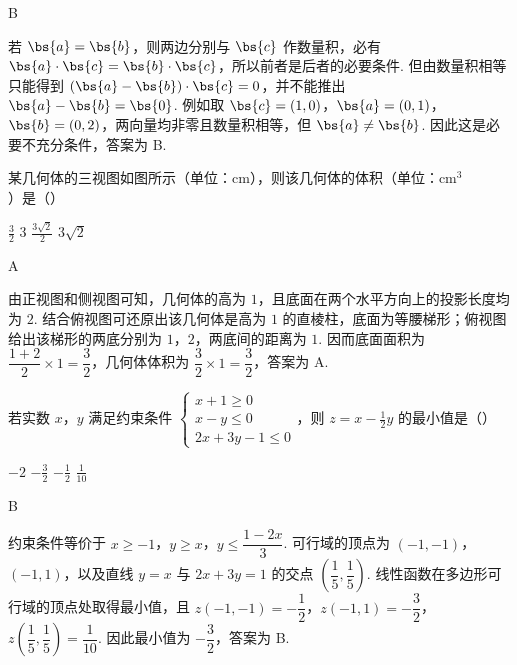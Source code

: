 \begin{answer}
B
\end{answer}

\begin{solution}
若 \(\bs{a}=\bs{b}\)，则两边分别与 \(\bs{c}\) 作数量积，必有 \(\bs{a}\cdot\bs{c}=\bs{b}\cdot\bs{c}\)，所以前者是后者的必要条件. 但由数量积相等只能得到 \((\bs{a}-\bs{b})\cdot\bs{c}=0\)，并不能推出 \(\bs{a}-\bs{b}=\bs{0}\). 例如取 \(\bs{c}=(1,0)\)，\(\bs{a}=(0,1)\)，\(\bs{b}=(0,2)\)，两向量均非零且数量积相等，但 \(\bs{a}\ne\bs{b}\). 因此这是必要不充分条件，答案为 B.
\end{solution}

\begin{problem}
某几何体的三视图如图所示（单位：\(\mathrm{cm}\)），则该几何体的体积（单位：\(\mathrm{cm}^3\)）是（\quad）


\choices
    {\(\frac{3}{2}\)}
    {\(3\)}
    {\(\frac{3\sqrt{2}}{2}\)}
    {\(3\sqrt{2}\)}
\end{problem}

\begin{answer}
A
\end{answer}

\begin{solution}
由正视图和侧视图可知，几何体的高为 \(1\)，且底面在两个水平方向上的投影长度均为 \(2\). 结合俯视图可还原出该几何体是高为 \(1\) 的直棱柱，底面为等腰梯形；俯视图给出该梯形的两底分别为 \(1\)，\(2\)，两底间的距离为 \(1\). 因而底面面积为 \(\dfrac{1+2}{2}\times1=\dfrac32\)，几何体体积为 \(\dfrac32\times1=\dfrac32\)，答案为 A.
\end{solution}

\begin{problem}
若实数 \(x\)，\(y\) 满足约束条件 \(\begin{cases}
x+1\ge 0\\
x-y\le 0\\
2x+3y-1\le 0
\end{cases}\)，则 \(z=x-\frac{1}{2}y\) 的最小值是（\quad）

\choices
    {\(-2\)}
    {\(-\frac{3}{2}\)}
    {\(-\frac{1}{2}\)}
    {\(\frac{1}{10}\)}
\end{problem}

\begin{answer}
B
\end{answer}

\begin{solution}
约束条件等价于 \(x\geq-1\)，\(y\geq x\)，\(y\leq\dfrac{1-2x}{3}\). 可行域的顶点为 \((-1,-1)\)，\((-1,1)\)，以及直线 \(y=x\) 与 \(2x+3y=1\) 的交点 \(\left(\dfrac15,\dfrac15\right)\). 线性函数在多边形可行域的顶点处取得最小值，且
\(z(-1,-1)=-\dfrac12\)，\(z(-1,1)=-\dfrac32\)，\(z\left(\dfrac15,\dfrac15\right)=\dfrac1{10}\). 因此最小值为 \(-\dfrac32\)，答案为 B.
\end{solution}

